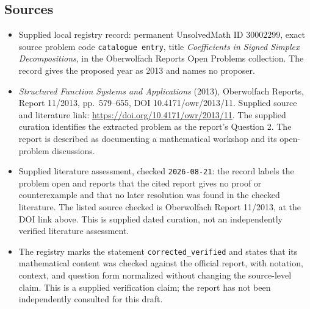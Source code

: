 \documentclass[11pt]{article}
\begin{document}
\subsection{Sources}
\begin{itemize}
\item Supplied local registry record: permanent UnsolvedMath ID \(30002299\), exact source problem code \texttt{catalogue entry}, title \emph{Coefficients in Signed Simplex Decompositions}, in the Oberwolfach Reports Open Problems collection. The record gives the proposed year as 2013 and names no proposer.
\item \emph{Structured Function Systems and Applications} (2013), Oberwolfach Reports, Report 11/2013, pp.\ 579--655, DOI 10.4171/owr/2013/11. Supplied source and literature link: \url{https://doi.org/10.4171/owr/2013/11}. The supplied curation identifies the extracted problem as the report's Question 2. The report is described as documenting a mathematical workshop and its open-problem discussions.
\item Supplied literature assessment, checked \texttt{2026-08-21}: the record labels the problem open and reports that the cited report gives no proof or counterexample and that no later resolution was found in the checked literature. The listed source checked is Oberwolfach Report 11/2013, at the DOI link above. This is supplied dated curation, not an independently verified literature assessment.
\item The registry marks the statement \texttt{corrected\_verified} and states that its mathematical content was checked against the official report, with notation, context, and question form normalized without changing the source-level claim. This is a supplied verification claim; the report has not been independently consulted for this draft.
\end{itemize}
\end{document}
